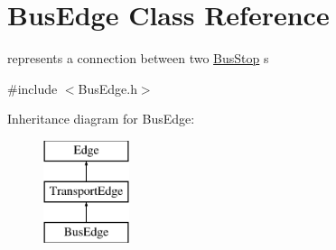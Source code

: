 \hypertarget{class_bus_edge}{}\section{Bus\+Edge Class Reference}
\label{class_bus_edge}


represents a connection between two \hyperlink{class_bus_stop}{Bus\+Stop} \textquotesingle{}s  




{\ttfamily \#include $<$Bus\+Edge.\+h$>$}

Inheritance diagram for Bus\+Edge\+:\begin{figure}[H]
\begin{center}
\leavevmode
\includegraphics[height=3.000000cm]{class_bus_edge}
\end{center}
\end{figure}
